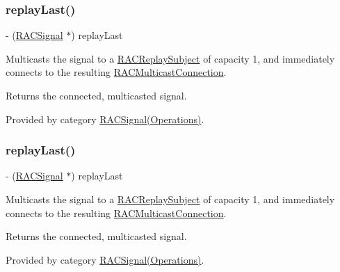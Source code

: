 \subsubsection{\texorpdfstring{replay\+Last()}{replayLast()}\hspace{0.1cm}{\footnotesize\ttfamily [2/3]}}
{\footnotesize\ttfamily -\/ (\mbox{\hyperlink{interface_r_a_c_signal}{R\+A\+C\+Signal}} $\ast$) replay\+Last \begin{DoxyParamCaption}{ }\end{DoxyParamCaption}}

Multicasts the signal to a \mbox{\hyperlink{interface_r_a_c_replay_subject}{R\+A\+C\+Replay\+Subject}} of capacity 1, and immediately connects to the resulting \mbox{\hyperlink{interface_r_a_c_multicast_connection}{R\+A\+C\+Multicast\+Connection}}.

Returns the connected, multicasted signal. 

Provided by category \mbox{\hyperlink{category_r_a_c_signal_07_operations_08_a1a660e0db48169a1ea54288b196515b1}{R\+A\+C\+Signal(\+Operations)}}.

\mbox{\label{interface_r_a_c_signal_a1a660e0db48169a1ea54288b196515b1}} 
\subsubsection{\texorpdfstring{replay\+Last()}{replayLast()}\hspace{0.1cm}{\footnotesize\ttfamily [3/3]}}
{\footnotesize\ttfamily -\/ (\mbox{\hyperlink{interface_r_a_c_signal}{R\+A\+C\+Signal}} $\ast$) replay\+Last \begin{DoxyParamCaption}{ }\end{DoxyParamCaption}}

Multicasts the signal to a \mbox{\hyperlink{interface_r_a_c_replay_subject}{R\+A\+C\+Replay\+Subject}} of capacity 1, and immediately connects to the resulting \mbox{\hyperlink{interface_r_a_c_multicast_connection}{R\+A\+C\+Multicast\+Connection}}.

Returns the connected, multicasted signal. 

Provided by category \mbox{\hyperlink{category_r_a_c_signal_07_operations_08_a1a660e0db48169a1ea54288b196515b1}{R\+A\+C\+Signal(\+Operations)}}.

\mbox{\label{interface_r_a_c_signal_aa1a3386d321ec82ceff16d98eaf74d33}} 
